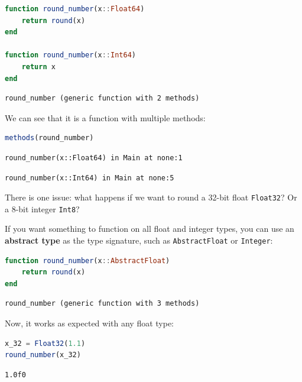\documentclass[
  notoc %
]{tufte-book}
\newcommand{\passthrough}[1]{#1}
\begin{document}
\begin{lstlisting}[language=Julia]
function round_number(x::Float64)
    return round(x)
end

function round_number(x::Int64)
    return x
end
\end{lstlisting}

\begin{lstlisting}[language=Output]
round_number (generic function with 2 methods)
\end{lstlisting}

We can see that it is a function with multiple methods:

\begin{lstlisting}[language=Julia]
methods(round_number)
\end{lstlisting}

\begin{lstlisting}[language=Output]
round_number(x::Float64) in Main at none:1
\end{lstlisting}

\begin{lstlisting}[language=Output]
round_number(x::Int64) in Main at none:5
\end{lstlisting}

There is one issue: what happens if we want to round a 32-bit float
\passthrough{\lstinline!Float32!}? Or a 8-bit integer
\passthrough{\lstinline!Int8!}?

If you want something to function on all float and integer types, you
can use an \textbf{abstract type} as the type signature, such as
\passthrough{\lstinline!AbstractFloat!} or
\passthrough{\lstinline!Integer!}:

\begin{lstlisting}[language=Julia]
function round_number(x::AbstractFloat)
    return round(x)
end
\end{lstlisting}

\begin{lstlisting}[language=Output]
round_number (generic function with 3 methods)
\end{lstlisting}

Now, it works as expected with any float type:

\begin{lstlisting}[language=Julia]
x_32 = Float32(1.1)
round_number(x_32)
\end{lstlisting}

\begin{lstlisting}[language=Output]
1.0f0
\end{lstlisting}
\end{document}
